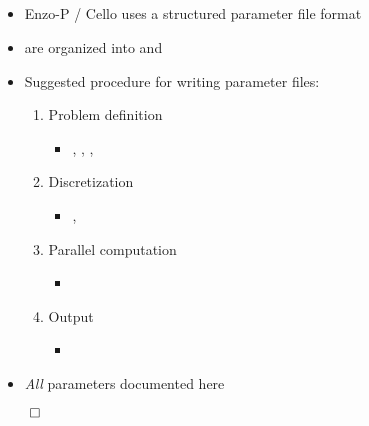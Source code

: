 \NEWSEC

\subsection{\ssParametersSummary}


\begin{frame}[fragile,label=ss-parameters-summary] 
\secframetitle{\ssParametersSummary}
\begin{itemize}
\item Enzo-P / Cello uses a structured parameter file format
\item {} are organized into  and 
\item Suggested procedure for writing parameter files:
\begin{enumerate}
\item Problem definition
\begin{itemize}
\item {}, , , 
\end{itemize}
\item Discretization
\begin{itemize}
\item {}, 
\end{itemize}
\item Parallel computation
\begin{itemize}
\item {}
\end{itemize}
\item Output
\begin{itemize}
\item {}
\end{itemize}
\end{enumerate}
\item \textit{All} parameters documented here 
\end{itemize}
\vfill
\centerline{$\qed$}
\end{frame}

